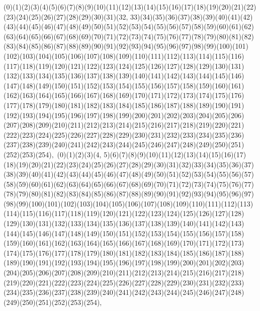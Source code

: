 \documentclass[12pt]{article}
\begin{document}
{(0)(1)(2)(3)(4)(5)(6)(7)(8)(9)(10)(11)(12)(13)(14)(15)(16)(17)(18)(19)(20)(21)(22)(23)(24)(25)(26)(27)(28)(29)(30)(31)(32, 33)(34)(35)(36)(37)(38)(39)(40)(41)(42)(43)(44)(45)(46)(47)(48)(49)(50)(51)(52)(53)(54)(55)(56)(57)(58)(59)(60)(61)(62)(63)(64)(65)(66)(67)(68)(69)(70)(71)(72)(73)(74)(75)(76)(77)(78)(79)(80)(81)(82)(83)(84)(85)(86)(87)(88)(89)(90)(91)(92)(93)(94)(95)(96)(97)(98)(99)(100)(101)(102)(103)(104)(105)(106)(107)(108)(109)(110)(111)(112)(113)(114)(115)(116)(117)(118)(119)(120)(121)(122)(123)(124)(125)(126)(127)(128)(129)(130)(131)(132)(133)(134)(135)(136)(137)(138)(139)(140)(141)(142)(143)(144)(145)(146)(147)(148)(149)(150)(151)(152)(153)(154)(155)(156)(157)(158)(159)(160)(161)(162)(163)(164)(165)(166)(167)(168)(169)(170)(171)(172)(173)(174)(175)(176)(177)(178)(179)(180)(181)(182)(183)(184)(185)(186)(187)(188)(189)(190)(191)(192)(193)(194)(195)(196)(197)(198)(199)(200)(201)(202)(203)(204)(205)(206)(207)(208)(209)(210)(211)(212)(213)(214)(215)(216)(217)(218)(219)(220)(221)(222)(223)(224)(225)(226)(227)(228)(229)(230)(231)(232)(233)(234)(235)(236)(237)(238)(239)(240)(241)(242)(243)(244)(245)(246)(247)(248)(249)(250)(251)(252)(253)(254)$
, 
$
(0)(1)(2)(3)(4, 5)(6)(7)(8)(9)(10)(11)(12)(13)(14)(15)(16)(17)(18)(19)(20)(21)(22)(23)(24)(25)(26)(27)(28)(29)(30)(31)(32)(33)(34)(35)(36)(37)(38)(39)(40)(41)(42)(43)(44)(45)(46)(47)(48)(49)(50)(51)(52)(53)(54)(55)(56)(57)(58)(59)(60)(61)(62)(63)(64)(65)(66)(67)(68)(69)(70)(71)(72)(73)(74)(75)(76)(77)(78)(79)(80)(81)(82)(83)(84)(85)(86)(87)(88)(89)(90)(91)(92)(93)(94)(95)(96)(97)(98)(99)(100)(101)(102)(103)(104)(105)(106)(107)(108)(109)(110)(111)(112)(113)(114)(115)(116)(117)(118)(119)(120)(121)(122)(123)(124)(125)(126)(127)(128)(129)(130)(131)(132)(133)(134)(135)(136)(137)(138)(139)(140)(141)(142)(143)(144)(145)(146)(147)(148)(149)(150)(151)(152)(153)(154)(155)(156)(157)(158)(159)(160)(161)(162)(163)(164)(165)(166)(167)(168)(169)(170)(171)(172)(173)(174)(175)(176)(177)(178)(179)(180)(181)(182)(183)(184)(185)(186)(187)(188)(189)(190)(191)(192)(193)(194)(195)(196)(197)(198)(199)(200)(201)(202)(203)(204)(205)(206)(207)(208)(209)(210)(211)(212)(213)(214)(215)(216)(217)(218)(219)(220)(221)(222)(223)(224)(225)(226)(227)(228)(229)(230)(231)(232)(233)(234)(235)(236)(237)(238)(239)(240)(241)(242)(243)(244)(245)(246)(247)(248)(249)(250)(251)(252)(253)(254)$
, 
$
}
\end{document}
